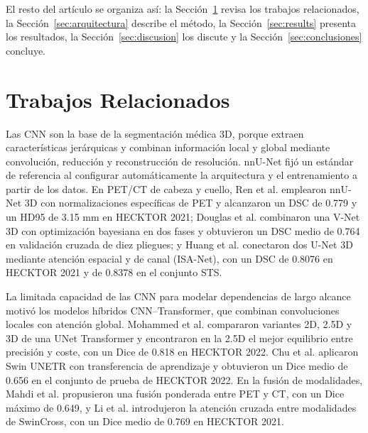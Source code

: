 \documentclass[conference]{IEEEtran}
\begin{document}
El resto del artículo se organiza así: la Sección~\ref{sec:state} revisa los trabajos relacionados, la Sección~\ref{sec:arquitectura} describe el método, la Sección~\ref{sec:results} presenta los resultados, la Sección~\ref{sec:discusion} los discute y la Sección~\ref{sec:conclusiones} concluye.

\section{Trabajos Relacionados}
\label{sec:state}

Las CNN son la base de la segmentación médica 3D, porque extraen características jerárquicas y combinan información local y global mediante convolución, reducción y reconstrucción de resolución. nnU-Net \cite{isensee2021nnunet} fijó un estándar de referencia al configurar automáticamente la arquitectura y el entrenamiento a partir de los datos. En PET/CT de cabeza y cuello, Ren et al. \cite{REN2021} emplearon nnU-Net 3D con normalizaciones específicas de PET y alcanzaron un DSC de 0.779 y un HD95 de 3.15 mm en HECKTOR 2021; Douglas et al. \cite{DOUGLAS2025110309} combinaron una V-Net 3D con optimización bayesiana en dos fases y obtuvieron un DSC medio de 0.764 en validación cruzada de diez pliegues; y Huang et al. \cite{isa_net2023} conectaron dos U-Net 3D mediante atención espacial y de canal (ISA-Net), con un DSC de 0.8076 en HECKTOR 2021 y de 0.8378 en el conjunto STS.

La limitada capacidad de las CNN para modelar dependencias de largo alcance motivó los modelos híbridos CNN–Transformer, que combinan convoluciones locales con atención global. Mohammed et al. \cite{SegmentationHeadNeckDualPETCT2025} compararon variantes 2D, 2.5D y 3D de una UNet Transformer y encontraron en la 2.5D el mejor equilibrio entre precisión y coste, con un Dice de 0.818 en HECKTOR 2022. Chu et al. \cite{Chu2023114} aplicaron Swin UNETR con transferencia de aprendizaje y obtuvieron un Dice medio de 0.656 en el conjunto de prueba de HECKTOR 2022. En la fusión de modalidades, Mahdi et al. \cite{MAHDI2024} propusieron una fusión ponderada entre PET y CT, con un Dice máximo de 0.649, y Li et al. \cite{Li_2023} introdujeron la atención cruzada entre modalidades de SwinCross, con un Dice medio de 0.769 en HECKTOR 2021.
\end{document}
